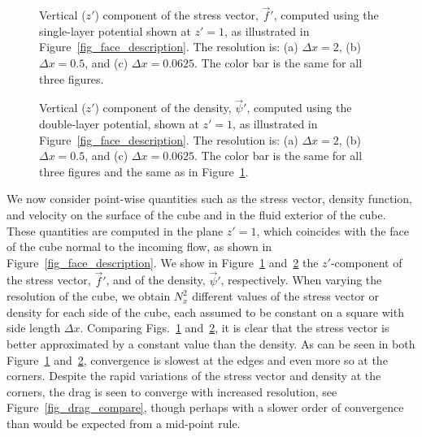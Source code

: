 \begin{figure}[ht]
	\begin{center}
	\end{center}
	\caption{Vertical ($z'$) component of the stress vector, $\vec{f}'$, computed using the single-layer potential shown at $z'=1$, as illustrated in Figure~\ref{fig_face_description}. The resolution is: (a) $\Delta x = 2$, (b) $\Delta x = 0.5$, and (c) $\Delta x =  0.0625$. The color bar is the same for all three figures.  }
	\label{fig_stress_cube8_32}
\end{figure}


\begin{figure}[ht]
	\begin{center}
	\end{center}
	\caption{Vertical ($z'$) component of the density, $\vec{\psi}'$, computed using the double-layer potential, shown at $z'=1$, as illustrated in Figure~\ref{fig_face_description}. The resolution is: (a) $\Delta x = 2$, (b) $\Delta x = 0.5$, and (c) $\Delta x =  0.0625$. The color bar is the same for all three figures and the same as in Figure~\ref{fig_stress_cube8_32}.}
	\label{fig_density_cube8_32}
\end{figure}
\par
We now consider point-wise quantities such as the stress vector, density function, and velocity on the surface of the cube and in the fluid exterior of the cube. 
These quantities are computed in the plane $z'=1$, which coincides with the face of the cube normal to the incoming flow, as shown in Figure~\ref{fig_face_description}. 
We show in Figure~\ref{fig_stress_cube8_32} and~\ref{fig_density_cube8_32} the $z'$-component of the stress vector, $\vec{f}'$, and of the density, $\vec{\psi}'$, 
respectively. 
When varying the resolution of the cube,  we obtain $N_x^2$ different values of the stress vector or density for each side of the cube, each assumed to be constant on a square with side length $\Delta x$.
Comparing Figs.~\ref{fig_stress_cube8_32} and~\ref{fig_density_cube8_32}, it is clear that the stress vector is better approximated by a constant value than the density.
 As can be seen in both Figure~\ref{fig_stress_cube8_32} and~\ref{fig_density_cube8_32}, convergence is slowest at the edges and even more so at the corners. Despite the rapid variations of the stress vector and density at the corners, the drag is seen to converge with increased resolution, see Figure~\ref{fig_drag_compare}, though perhaps with a slower order of convergence than would be expected from a mid-point rule.
